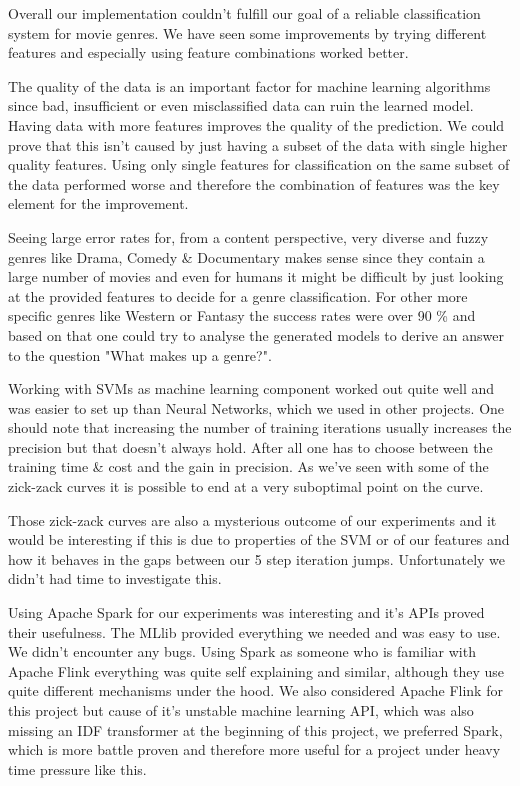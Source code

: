 \documentclass{vldb}
\begin{document}
\par Overall our implementation couldn't fulfill our goal of a reliable classification system for movie genres. We have seen some improvements by trying different features and especially using feature combinations worked better.
\par The quality of the data is an important factor for machine learning algorithms since bad, insufficient or even misclassified data can ruin the learned model. Having data with more features improves the quality of the prediction. We could prove that this isn't caused by just having a subset of the data with single higher quality features. Using only single features for classification on the same subset of the data performed worse and therefore the combination of features was the key element for the improvement.
\par Seeing large error rates for, from a content perspective, very diverse and fuzzy genres like Drama, Comedy \& Documentary makes sense since they contain a large number of movies and even for humans it might be difficult by just looking at the provided features to decide for a genre classification. For other more specific genres like Western or Fantasy the success rates were over 90 \% and based on that one could try to analyse the generated models to derive an answer to the question "What makes up a genre?".
\par Working with SVMs as machine learning component worked out quite well and was easier to set up than Neural Networks, which we used in other projects. One should note that increasing the number of training iterations usually increases the precision but that doesn't always hold. After all one has to choose between the training time \& cost and the gain in precision. As we've seen with some of the zick-zack curves it is possible to end at a very suboptimal point on the curve.
\par Those zick-zack curves are also a mysterious outcome of our experiments and it would be interesting if this is due to properties of the SVM or of our features and how it behaves in the gaps between our 5 step iteration jumps. Unfortunately we didn't had time to investigate this.
\par Using Apache Spark for our experiments was interesting and it's APIs proved their usefulness. The MLlib provided everything we needed and was easy to use. We didn't encounter any bugs. Using Spark as someone who is familiar with Apache Flink\cite{flink} everything was quite self explaining and similar, although they use quite different mechanisms under the hood. We also considered Apache Flink for this project but cause of it's unstable machine learning API, which was also missing an IDF transformer at the beginning of this project, we preferred Spark, which is more battle proven and therefore more useful for a project under heavy time pressure like this.
\end{document}
